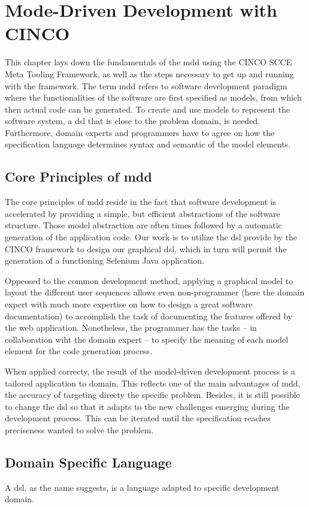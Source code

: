 
\chapter{Mode-Driven Development with CINCO}\label{ch:Basis}

This chapter lays down the fundamentals of the \acrfull{mdd} using the CINCO SCCE Meta Tooling Framework, as well as the steps necessary to get up and running with the framework.
The term \acrshort{mdd} refers to software development paradigm where the functionalities of the software are first specified as models, from which then actual code can be generated.
To create and use models to represent the software system, a \acrfull{dsl} that is close to the problem domain, is needed. Furthermore, domain experts and programmers have to agree on how the specification language determines syntax and semantic of the model elements.

\section[CoreMDD]{Core Principles of \acrshort{mdd}}

The core principles of \acrshort{mdd} reside in the fact that software development is accelerated by providing a simple, but efficient abstractions of the software structure. Those model abstraction are often times followed by a automatic generation of the application code. Our work is to utilize the \acrshort{dsl} provide by the CINCO framework to design our graphical \acrshort{dsl}, which in turn will permit the generation of a functioning \gls{Selenium} Java application.

Oppeosed to the common development method, applying a graphical model to layout the different user sequences allows even non-programmer (here the domain expert with much more expertise on how to design a great software documentation) to accomplish the task of documenting the features offered by the web application. Nonetheless, the programmer has the tasks -- in collaboration wiht the domain expert -- to specify the meaning of each model element for the code generation process.

When applied correcty, the result of the model-driven development process is a tailored application to domain. This reflects one of the main advantages of \acrshort{mdd}, the accuracy of targeting directy the specific problem. Besides, it is still possible to change the \acrshort{dsl} so that it adapts to the new challenges emerging during the development process. This can be iterated until the specification reaches preciseness wanted to solve the problem.

\section[DSL]{Domain Specific Language}

A \acrfull{dsl}, as the name suggests, is a language adapted to specific development domain.